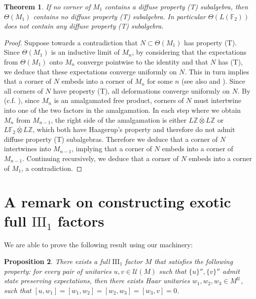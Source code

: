 \documentclass[10pt]{amsart}
\numberwithin{equation}{section}
\newtheorem{thm}{Theorem}[section]
\newtheorem{prop}[thm]{Proposition}
\theoremstyle{definition}
\newcommand{\Z}{\mathbb{Z}}
\newcommand{\F}{\mathbb{F}}
\newcommand{\ootimes}{\mathbin{\overline{\otimes}}}
\begin{document}
\begin{thm}
    If no corner of $M_1$ contains a diffuse property (T) subalgebra, then $\Theta(M_1)$ contains no diffuse property (T) subalgebra. In particular $\Theta(L(\mathbb{F}_2))$ does not contain any diffuse property (T) subalgebra. 
\end{thm}

\begin{proof}
    Suppose towards a contradiction that $N\subset \Theta(M_1)$ has property (T). Since $\Theta(M_1)$ is an inductive limit of $M_n$, by considering that the expectations from $\Theta(M_1)$ onto $M_n$ converge pointwise to the identity and that $N$ has (T), we deduce that these expectations converge uniformly on $N.$ This in turn implies that a corner of $N$ embeds into a corner of $M_n$ for some $n$ \cite[Theorem~4.6]{christensen1979} (see also \cite{PopaCorr} and \cite[Theorem~3.26]{GKEPTconjugacy2025}). Since all corners of $N$ have property (T), all deformations converge uniformly on $N$. By \cite[Theorem~5.4]{PV09} (c.f. \cite[Theorem~1.1]{IPP}), since $M_n$ is an amalgamated free product, corners of $N$ must intertwine into one of the two factors in the amalgamation. In each step where we obtain $M_n$ from $M_{n-1}$, the right side of the amalgamation is either $L\Z \ootimes L\Z$ or $L\F_2\ootimes L\Z$, which both have Haagerup's property and therefore do not admit diffuse property (T) subalgebras. Therefore we deduce that a corner of $N$ intertwines into $M_{n-1}$, implying that a corner of $N$ embeds into a corner of $M_{n-1}$. Continuing recursively, we deduce that a corner of $N$ embeds into a corner of $M_1$, a contradiction.
\end{proof}


\section{A remark on constructing exotic full $\mathrm{III}_1$ factors} \label{sec: type III setting}

We are able to prove the following result using our machinery:

\begin{prop}
    There exists a full $\mathrm{III}_1$ factor $M$ that satisfies the following property: for every pair of unitaries $u,v\in \mathcal{U}(M)$ such that $\{u\}'',\{v\}''$ admit state preserving expectations, then there exists Haar unitaries $w_1,w_2,w_3\in M^\mathcal{U}$, such that $[u,w_1]=[w_1,w_2]=[w_2,w_3]= [w_3,v]=0$. 
\end{prop}
\end{document}
